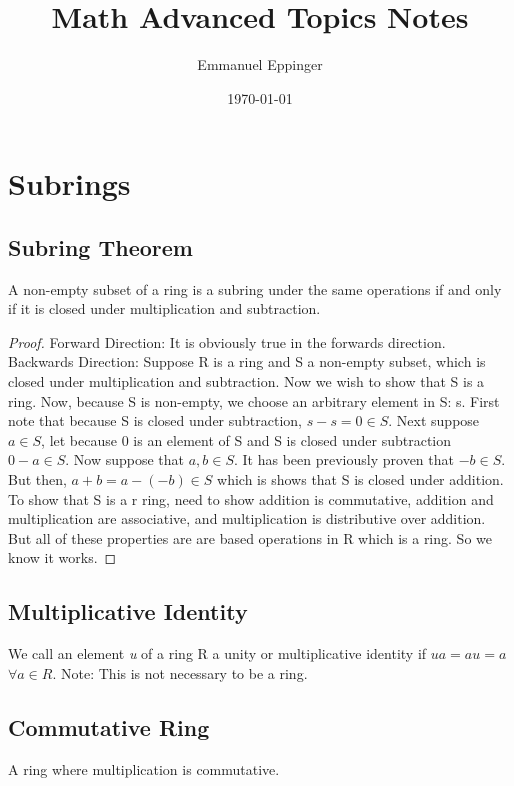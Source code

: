 \documentclass{article}
\title{Math Advanced Topics Notes}
\author{Emmanuel Eppinger}
\date{\today}
\theoremstyle{definition}
\theoremstyle{remark}
\begin{document}
\maketitle
\section{Subrings}
\subsection{Subring Theorem}
A non-empty subset of a ring is a subring under the same operations if and only if it is closed under multiplication and subtraction.
\begin{proof}

Forward Direction: It is obviously true in the forwards direction.
Backwards Direction:
Suppose R is a ring and S a non-empty subset, which is closed under multiplication and subtraction. Now we wish to show that S is a ring. Now, because S is non-empty, we choose an arbitrary element in S: s. First note that because S is closed under subtraction, $s-s=0 \in S$. Next suppose $a \in S$, let because 0 is an element of S and S is closed under subtraction $0-a \in S$. Now suppose that $a,b \in S$. It has been previously proven that $-b \in S$. But then, $a+b=a-(-b) \in S$ which is shows that S is closed under addition.\\

To show that S is a r ring, need to show addition is commutative, addition and multiplication are associative, and multiplication is distributive over addition. But all of these properties are are based operations in R which is a ring. So we know it works.

\end{proof}

\subsection{Multiplicative Identity}
We call an element \textit{u} of a ring R a unity or multiplicative identity if $ua = au = a$ $\forall a \in R$. Note: This is not necessary to be a ring.

\subsection{Commutative Ring}
A ring where multiplication is commutative.
\end{document}
